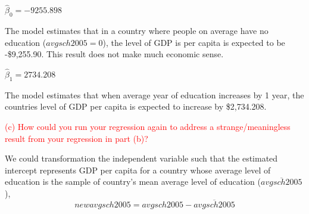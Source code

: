 \documentclass[12pt]{report}
\begin{document}
\noindent $\hat{\beta}_0 = -9255.898$ 

\noindent The model estimates that in a country where people on average have no education ($avgsch2005 = 0$), the level of GDP is per capita is expected to be -\$9,255.90. This result does not make much economic sense.

\noindent $\hat{\beta}_1 = 2734.208$ 

\noindent The model estimates that when average year of education increases by 1 year, the countries level of GDP per capita is expected to increase by \$2,734.208.

\noindent \textcolor{red}{(c) How could you run your regression again to address a strange/meaningless result from your regression in part (b)?}

\noindent We could transformation the independent variable such that the estimated intercept represents GDP per capita for a country whose average level of education is the sample of country's mean average level of education ($\overline{avgsch2005}$), $$newavgsch2005 = avgsch2005 - \overline{avgsch2005}$$
\end{document}
